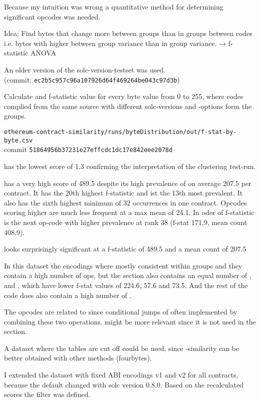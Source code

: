 \documentclass[../main.tex]{subfiles}
\begin{document}
Because my intuition was wrong a quantitative method for determining significant opcodes was needed.

Idea: Find bytes that change more between groups than in groups between codes i.e. bytes with higher between group variance than in group variance. → f-statistic ANOVA

An older version of the solc-version-testset was used.\\
(commit: \texttt{ec2b5c957c96a107926d64f469264be043c97d3b})

Calculate and f-statistic value for every byte value from 0 to 255, where codes complied from the same source with different solc-versions and -options form the groups.

\texttt{ethereum-contract-similarity/runs/byteDistribution/out/f-stat-by-byte.csv}\\
commit \texttt{51864956b37231e27effcdc1dc17e842eee2078d}

 has the lowest score of 1.3 confirming the interpretation of the clustering test-run.

 has a very high score of 489.5 despite its high prevalence of on average 207.5 per contract. It has the 20th highest f-statistic and ist the 13th most prevalent. It also has the sixth highest minimum of 32 occurrences in one contract. Opcodes scoring higher are much less frequent at a max mean of 24.1. In oder of f-statistic  is the next op-code with higher prevalence at rank 38 (f-stat 171.9, mean count 408.9).

 looks surprisingly significant at a f-statistic of 489.5 and a mean count of 207.5

In this dataset the  encodings where mostly consistent within groups and they contain a high number of  ops, but the  section also contains an equal number of ,  and , which have lower f-stat values of 224.6, 57.6 and 73.5. And the rest of the code does also contain a high number of .

The  opcodes are related to  since conditional jumps of often implemented by combining these two operations.  might be more relevant since it is not used in the  section.

A dataset where the  tables are cut off could be used, since -similarity can be better obtained with other methods (fourbytes).

I extended the dataset with fixed ABI encodings v1 and v2 for all contracts, because the default changed with solc version 0.8.0.
Based on the recalculated scores the  filter was defined.
\end{document}
